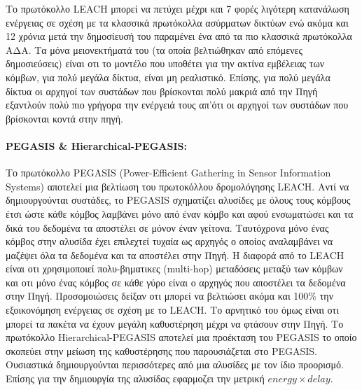 Το πρωτόκολλο LEACH μπορεί να πετύχει μέχρι και 7 φορές λιγότερη κατανάλωση ενέργειας σε σχέση με τα κλασσικά πρωτόκολλα ασύρματων δικτύων \cite{leach_protocol} ενώ
ακόμα και 12 χρόνια μετά την δημοσίευσή του παραμένει ένα από τα πιο κλασσικά πρωτόκολλα ΑΔΑ. Τα μόνα μειονεκτήματά του (τα οποία βελτιώθηκαν από επόμενες
δημοσιεύσεις) είναι οτι το μοντέλο που υποθέτει για την ακτίνα εμβέλειας των κόμβων, για πολύ μεγάλα δίκτυα, είναι μη ρεαλιστικό. Επίσης, για πολύ μεγάλα δίκτυα οι
αρχηγοί των συστάδων που βρίσκονται πολύ μακριά από την Πηγή εξαντλούν πολύ πιο γρήγορα την ενέργειά τους απ'ότι οι αρχηγοί των συστάδων που βρίσκονται κοντά στην
πηγή.

\paragraph{PEGASIS \& Hierarchical-PEGASIS:} Το πρωτόκολλο PEGASIS (Power-Efficient Gathering in Sensor Information Systems) \cite{pegasis_protocol} αποτελεί μια
βελτίωση του πρωτοκόλλου δρομολόγησης LEACH. Αντί να δημιουργούνται συστάδες, το PEGASIS σχηματίζει αλυσίδες με όλους τους κόμβους έτσι ώστε κάθε κόμβος λαμβάνει μόνο
από έναν κόμβο και αφού ενσωματώσει και τα δικά του δεδομένα τα αποστέλει σε μόνον έναν γείτονα. Ταυτόχρονα μόνο ένας κόμβος στην αλυσίδα έχει επιλεχτεί τυχαία ως
αρχηγός ο οποίος αναλαμβάνει να μαζέψει όλα τα δεδομένα και τα αποστέλει στην Πηγή. Η διαφορά από το LEACH είναι οτι χρησιμοποιεί πολυ-βηματικες (multi-hop)
μεταδόσεις μεταξύ των κόμβων και οτι μόνο ένας κόμβος σε κάθε γύρο είναι ο αρχηγός που αποστέλει τα δεδομένα στην Πηγή. Προσομοιώσεις δείξαν οτι μπορεί να βελτιώσει
ακόμα και 100\% την εξοικονόμηση ενέργειας σε σχέση με το LEACH. Το αρνητικό του όμως είναι οτι μπορεί τα πακέτα να έχουν μεγάλη καθυστέρηση μέχρι να φτάσουν στην
Πηγή. Το πρωτόκολλο Hierarchical-PEGASIS \cite{hierarchical_pegasis} αποτελεί μια προέκταση του PEGASIS το οποίο σκοπεύει στην μείωση της καθυστέρησης που
παρουσιάζεται στο PEGASIS. Ουσιαστικά δημιουργούνται περισσότερες από μια αλυσίδες με τον ίδιο προορισμό. Επίσης για την δημιουργία της αλυσίδας εφαρμοζει την μετρική
$energy\times delay$.

